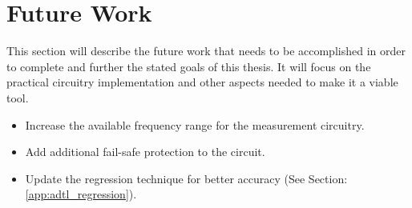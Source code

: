 \section {Future Work}

This section will describe the future work that needs to be accomplished in order to complete and further the stated goals of this thesis. It will focus on the practical circuitry implementation and other aspects needed to make it a viable tool.

\begin{itemize}
    \item Increase the available frequency range for the measurement circuitry.
    \item Add additional fail-safe protection to the circuit.
    \item Update the regression technique for better accuracy (See Section: \ref{app:adtl_regression}).
\end{itemize}

